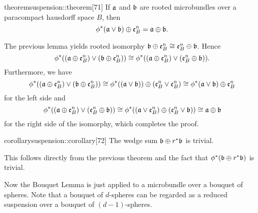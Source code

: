 \begin{mystatement}{theorem}{suspension::theorem}[71]
    If $\mathfrak{a}$ and $\bb$ are rooted microbundles
    over a paracompact hausdorff space $B$, then
    \[ \whitney{\ind{\phi}(\ba \vee \bb)}{\be{B}} = \whitney{\ba}{\bb}. \]
\end{mystatement}

\begin{myproof}
    The previous lemma yields rooted isomorphy $\whitney{\bb}{\be{B}} \cong \whitney{\be{B}}{\bb}$.
    Hence
    \[
        \ind{\phi}((\whitney{\ba}{\be{B}}) \vee (\whitney{\bb}{\be{B}}))
        \cong \ind{\phi}((\whitney{\ba}{\be{B}}) \vee (\whitney{\be{B}}{\bb})).
    \]
    Furthermore, we have
    \[
        \ind{\phi}((\whitney{\ba}{\be{B}}) \vee (\whitney{\bb}{\be{B}})) \cong
        \whitney{\ind{\phi}((\ba \vee \bb))}{(\be{B} \vee \be{B})}
        \cong \whitney{\ind{\phi}(\ba \vee \bb)}{\be{B}}
    \]
    for the left side and
    \[
        \ind{\phi}((\whitney{\ba}{\be{B}}) \vee (\whitney{\be{B}}{\bb})) \cong
        \ind{\phi}(\whitney{(\ba \vee \be{B})}{(\be{B} \vee \bb)})
        \cong \whitney{\ba}{\bb}
    \]
    for the right side of the isomorphy, which completes the proof.
\end{myproof}

\begin{mystatement}{corollary}{suspension::corollary}[72]
    The wedge sum $\whitney{\bb}{\ind{r}\bb}$ is trivial.
\end{mystatement}

\begin{myproof}
    This follows directly from the previous theorem and
    the fact that $\ind{\phi}(\whitney{\bb}{\ind{r}\bb})$ is trivial.
\end{myproof}

\begin{myparagraph}
    Now the Bouquet Lemma is just  applied to
    a microbundle over a bouquet of spheres.
    Note that a bouquet of $d$-spheres can be regarded
    as a reduced suspension over a bouquet of $(d-1)$-spheres.
\end{myparagraph}
